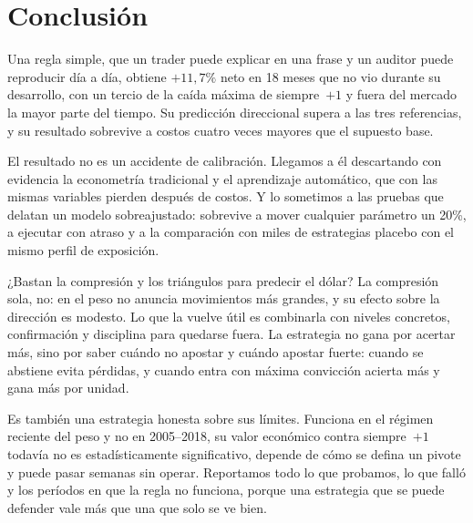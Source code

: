 \documentclass[10pt,a4paper]{article}
\begin{document}
\section{Conclusión}\label{sec:conclusion}

Una regla simple, que un trader puede explicar en una frase y un auditor puede
reproducir día a día, obtiene $+11{,}7\%$ neto en 18 meses que no vio durante su
desarrollo, con un tercio de la caída máxima de siempre~$+1$ y fuera del mercado la mayor
parte del tiempo. Su predicción direccional supera a las tres referencias, y su resultado
sobrevive a costos cuatro veces mayores que el supuesto base.

El resultado no es un accidente de calibración. Llegamos a él descartando con evidencia
la econometría tradicional y el aprendizaje automático, que con las mismas variables
pierden después de costos. Y lo sometimos a las pruebas que delatan un modelo
sobreajustado: sobrevive a mover cualquier parámetro un 20\%, a ejecutar con atraso y a
la comparación con miles de estrategias placebo con el mismo perfil de exposición.

¿Bastan la compresión y los triángulos para predecir el dólar? La compresión sola, no:
en el peso no anuncia movimientos más grandes, y su efecto sobre la dirección es modesto.
Lo que la vuelve útil es combinarla con niveles concretos, confirmación y disciplina para
quedarse fuera. La estrategia no gana por acertar más, sino por saber cuándo no apostar y
cuándo apostar fuerte: cuando se abstiene evita pérdidas, y cuando entra con máxima
convicción acierta más y gana más por unidad.

Es también una estrategia honesta sobre sus límites. Funciona en el régimen reciente del
peso y no en 2005--2018, su valor económico contra siempre~$+1$ todavía no es
estadísticamente significativo, depende de cómo se defina un pivote y puede pasar semanas
sin operar. Reportamos todo lo que probamos, lo que falló y los períodos en que la regla
no funciona, porque una estrategia que se puede defender vale más que una que solo se ve
bien.
\end{document}
